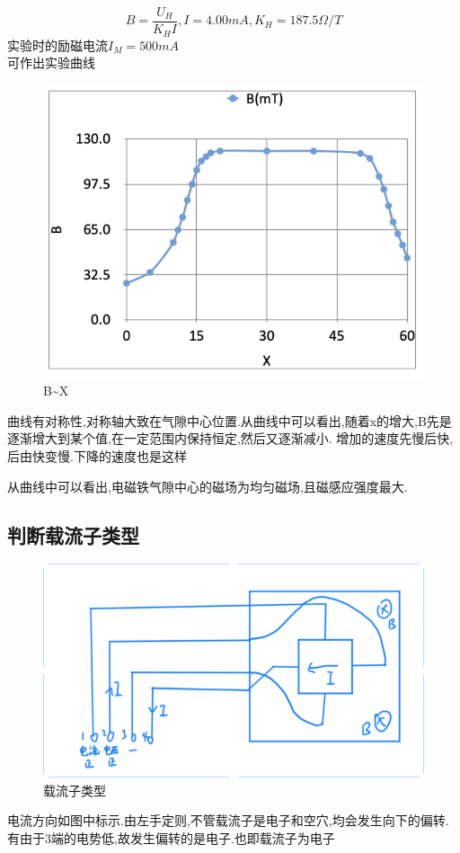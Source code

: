 \documentclass{thuemp}
\begin{document}
\[B=\frac{U_{H}}{K_{H}I},I=4.00mA,K_{H}=187.5 \Omega/T\]
	实验时的励磁电流$I_{M}=500mA$
\\可作出实验曲线
\begin{figure}[H]
	\centering
	\includegraphics[width=0.8\linewidth]{./image/5.png}
	\caption{B\~{}X} \label{fig:eg}
\end{figure}
曲线有对称性,对称轴大致在气隙中心位置.从曲线中可以看出,随着x的增大,B先是逐渐增大到某个值,在一定范围内保持恒定,然后又逐渐减小.
增加的速度先慢后快,后由快变慢.下降的速度也是这样

从曲线中可以看出,电磁铁气隙中心的磁场为均匀磁场,且磁感应强度最大.
\subsection{判断载流子类型}
\begin{figure}[H]
	\centering
	\includegraphics[width=0.8\linewidth]{./image/14.png}
	\caption{载流子类型} \label{fig:eg}
\end{figure}
电流方向如图中标示.由左手定则,不管载流子是电子和空穴,均会发生向下的偏转.有由于3端的电势低,故发生偏转的是电子.也即载流子为电子
\end{document}
